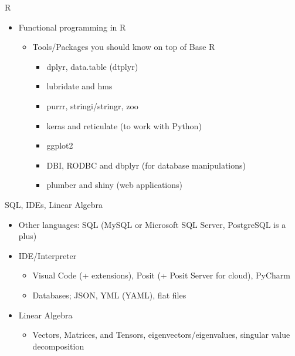 \documentclass[compress,brown]{beamer}
\begin{document}
\begin{frame}{R}
\begin{itemize}
	\item Functional programming in R
	\begin{itemize}
		\item Tools/Packages you should know on top of Base R
		\begin{itemize}
			\item dplyr, data.table (dtplyr)
			\item lubridate and hms
			\item purrr, stringi/stringr, zoo
			\item keras and reticulate (to work with Python)
			\item ggplot2
			\item DBI, RODBC and dbplyr (for database manipulations)
			\item plumber and shiny (web applications)
		\end{itemize}
	\end{itemize}
\end{itemize}
\end{frame}

	
\begin{frame}{SQL, IDEs, Linear Algebra}	
		\begin{itemize}
			\item Other languages: SQL (MySQL or Microsoft SQL Server, PostgreSQL is a plus)
			\item IDE/Interpreter
			\begin{itemize}
				\item Visual Code (+ extensions), Posit (+ Posit Server for cloud), PyCharm
				\item Databases; JSON, YML (YAML), flat files
			\end{itemize}
		\end{itemize}
	
		\begin{itemize}
			\item Linear Algebra
		\begin{itemize}
			\item Vectors, Matrices, and Tensors, eigenvectors/eigenvalues, singular value decomposition
		\end{itemize}
	\end{itemize}		

\end{frame}
\end{document}
